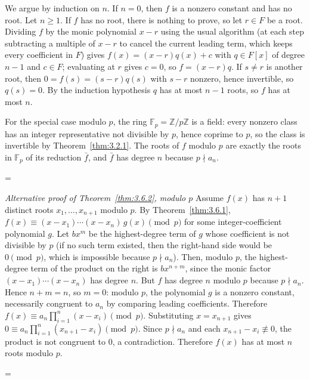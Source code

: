 \documentclass[11pt]{article}
\makeatletter
\theoremstyle{ntstyle}
\let\nt@closedisplay\]
\def\nt@guardedclose{\@ifnextchar\par{\nt@closeafterpar}{\@ifnextchar\end{\postdisplaypenalty\@M\nt@closedisplay}{\nt@closedisplay}}}
\def\nt@closeafterpar\par{\@ifnextchar\par{\nt@closeafterpar}{\@ifnextchar\end{\postdisplaypenalty\@M\nt@closedisplay\par}{\nt@closedisplay\par}}}
\renewenvironment{proof}[1][\proofname]{\par
  \pushQED{\qed}\normalfont\topsep\medskipamount\edef\nt@afterproof{\@endparpenalty=\the\@endparpenalty\relax}\@beginparpenalty\@M\@endparpenalty\@M\let\]\nt@guardedclose\trivlist\item[]\textit{#1\@addpunct{.}} \ignorespaces}{\ifvmode\addpenalty\@M\fi\popQED\nt@afterproof\endtrivlist\@endpefalse}
\newenvironment{altproof}[1][\proofname]{\begin{proof}[#1]\renewcommand{\qedsymbol}{}}{\end{proof}}
\makeatother
\begin{document}
\begin{proof} We argue by induction on $n$. If $n=0$, then $f$ is a nonzero constant
	and has no root. Let $n\ge1$. If $f$ has no root, there is nothing to prove,
	so let $r\in F$ be a root. Dividing $f$ by the monic polynomial $x-r$ using the
	usual algorithm (at each step subtracting a multiple of $x-r$ to cancel
	the current leading term, which keeps every coefficient in $F$) gives
	$f(x)=(x-r)q(x)+c$ with $q\in F[x]$ of degree $n-1$ and $c\in F$; evaluating
	at $r$ gives $c=0$, so $f=(x-r)q$. If $s\neq r$ is another root, then
	$0=f(s)=(s-r)q(s)$ with $s-r$ nonzero, hence invertible, so $q(s)=0$. By the
	induction hypothesis $q$ has at most $n-1$ roots, so $f$ has at most $n$.

	For the special case modulo $p$, the ring $\mathbb{F}_p=\mathbb{Z}/p\mathbb{Z}$ is a field:
	every nonzero class has an integer representative not divisible by $p$,
	hence coprime to $p$, so the class is invertible by
	Theorem~\ref{thm:3.2.1}. The roots of $f$ modulo $p$ are exactly the
	roots in $\mathbb{F}_p$ of its reduction $\bar f$, and $\bar f$ has degree
	$n$ because $p\nmid a_n$.

\end{proof}
\begin{altproof}[Alternative proof of Theorem~\ref{thm:3.6.2}, modulo $p$] Assume $f(x)$ has $n+1$ distinct roots
	$x_1, \ldots, x_{n+1}$ modulo $p$. By Theorem~\ref{thm:3.6.1}, $f(x) \equiv (x
		- x_1) \cdots (x - x_n)\, g(x) \pmod{p}$ for some integer-coefficient
	polynomial $g$. Let $b x^m$ be the highest-degree term of $g$ whose
	coefficient is not divisible by $p$ (if no such term existed, then the
	right-hand side would be $0 \pmod{p}$, which is impossible because $p\nmid a_n$).
	Then, modulo $p$, the highest-degree term of the product on the right is
	$b x^{n+m}$, since the monic factor $(x-x_1)\cdots(x-x_n)$ has degree
	$n$. But $f$ has degree $n$ modulo $p$ because $p\nmid a_n$. Hence
	$n+m=n$, so $m=0$: modulo $p$, the polynomial $g$ is a nonzero constant, necessarily
	congruent to $a_n$ by comparing leading coefficients. Therefore
	$f(x) \equiv a_n \prod_{i=1}^{n}(x - x_i) \pmod{p}$. Substituting
	$x = x_{n+1}$ gives $0 \equiv a_n \prod_{i=1}^{n}(x_{n+1} - x_i)
		\pmod{p}$. Since $p \nmid a_n$ and each $x_{n+1} - x_i \not\equiv 0$,
	the product is not congruent to $0$, a contradiction. Therefore $f(x)$ has
	at most $n$ roots modulo $p$.

\end{altproof}
\newpage
\end{document}

